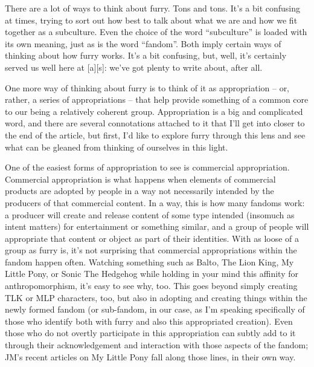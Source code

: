 
There are a lot of ways to think about furry. Tons and tons. It's a bit confusing at times, trying to sort out how best to talk about what we are and how we fit together as a subculture. Even the choice of the word ``subculture'' is loaded with its own meaning, just as is the word ``fandom''. Both imply certain ways of thinking about how furry works. It's a bit confusing, but, well, it's certainly served us well here at [a][s]: we've got plenty to write about, after all.

One more way of thinking about furry is to think of it as appropriation -- or, rather, a series of appropriations -- that help provide something of a common core to our being a relatively coherent group. Appropriation is a big and complicated word, and there are several connotations attached to it that I'll get into closer to the end of the article, but first, I'd like to explore furry through this lens and see what can be gleaned from thinking of ourselves in this light.

One of the easiest forms of appropriation to see is commercial appropriation. Commercial appropriation is what happens when elements of commercial products are adopted by people in a way not necessarily intended by the producers of that commercial content. In a way, this is how many fandoms work: a producer will create and release content of some type intended (insomuch as intent matters) for entertainment or something similar, and a group of people will appropriate that content or object as part of their identities. With as loose of a group as furry is, it's not surprising that commercial appropriations within the fandom happen often. Watching something such as Balto, The Lion King, My Little Pony, or Sonic The Hedgehog while holding in your mind this affinity for anthropomorphism, it's easy to see why, too. This goes beyond simply creating TLK or MLP characters, too, but also in adopting and creating things within the newly formed fandom (or sub-fandom, in our case, as I'm speaking specifically of those who identify both with furry and also this appropriated creation). Even those who do not overtly participate in this appropriation can subtly add to it through their acknowledgement and interaction with those aspects of the fandom; JM's recent articles on My Little Pony fall along those lines, in their own way.

